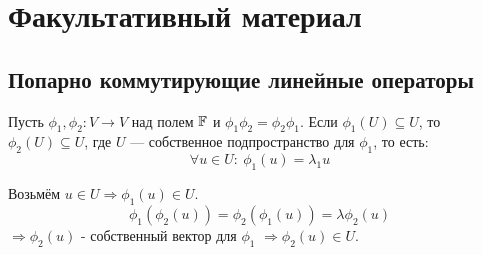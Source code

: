 
\section{Факультативный материал}
\subsection{Попарно коммутирующие линейные операторы}
Пусть $\phi_1, \phi_2: V \to V$ над полем $\mathbb{F}$ и $\phi_1 \phi_2 = \phi_2 \phi_1$. Если $\phi_1(U) \subseteq U$, то $\phi_2(U) \subseteq U$, где $U$ — собственное подпространство для $\phi_1$, то есть: \
\[\forall u \in U: \ \phi_1(u) = \lambda_1 u\]

Возьмём $u \in U \Longrightarrow \phi_1(u) \in U$.
\[\phi_1(\phi_2(u)) = \phi_2(\phi_1(u)) = \lambda \phi_2(u)\]
$\Longrightarrow \phi_2(u)$ - собственный вектор для $\phi_1$ $\Longrightarrow \phi_2(u) \in U$.

